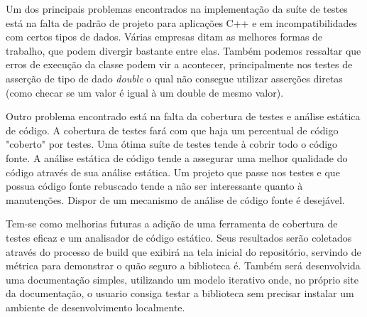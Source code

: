 \documentclass[
	article,			%
	12pt,				%
	oneside,			%
	a4paper,			%
	english,			
	brazil,
	sumario=tradicional
	]{abntex2}
\begin{document}
Um dos principais problemas encontrados na implementação da suíte de testes está na falta de padrão de projeto para aplicações C++ e em incompatibilidades com certos tipos de dados. Várias empresas ditam as melhores formas de trabalho, que podem divergir bastante entre elas. Também podemos ressaltar que erros de execução da classe podem vir a acontecer, principalmente nos testes de asserção de tipo de dado \textit{double} o qual não consegue utilizar asserções diretas (como checar se um valor é igual à um double de mesmo valor).

Outro problema encontrado está na falta da cobertura de testes e análise estática de código. A cobertura de testes fará com que haja um percentual de código "coberto" por testes. Uma ótima suíte de testes tende à cobrir todo o código fonte. A análise estática de código tende a assegurar uma melhor qualidade do código através de sua análise estática. Um projeto que passe nos testes e que possua código fonte rebuscado tende a não ser interessante quanto à manutenções. Dispor de um mecanismo de análise de código fonte é desejável.

Tem-se como melhorias futuras a adição de uma ferramenta de cobertura de testes eficaz e um analisador de código estático. Seus resultados serão coletados através do processo de build que exibirá na tela inicial do repositório, servindo de métrica para demonstrar o quão seguro a biblioteca é. Também será desenvolvida uma documentação simples, utilizando um modelo iterativo onde, no próprio site da documentação, o usuario consiga testar a biblioteca sem precisar instalar um ambiente de desenvolvimento localmente.




\postextual

\pagebreak

\nocite{cpluspluscom.1}
\nocite{cmakeorg.1}
\nocite{cxxtest.1}


%
%
\end{document}

